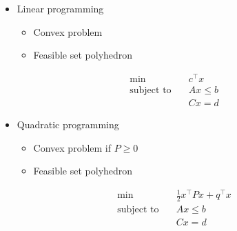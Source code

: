 \documentclass{article}
\begin{document}
\medskip   %
\begin{minipage}[c]{0.3\textwidth}
  \raggedright
  \begin{itemize}
    \item Linear programming
          \begin{itemize}
            \item Convex problem
            \item Feasible set polyhedron
          \end{itemize}
  \end{itemize}
\end{minipage}
\begin{minipage}[c]{0.3\textwidth}
  \centering
  \begin{align*}
    \min \quad              & c^{\top}x \\
    \text{subject to} \quad & Ax \leq b \\
                            & Cx = d
  \end{align*}
\end{minipage}
\begin{minipage}[c]{0.3\textwidth}
  \raggedleft
\end{minipage}

\begin{minipage}[c]{0.3\textwidth}
  \raggedright
  \begin{itemize}
    \item Quadratic programming
          \begin{itemize}
            \item Convex problem  if $P \geq 0$
            \item Feasible set polyhedron
          \end{itemize}
  \end{itemize}
\end{minipage}
\begin{minipage}[c]{0.3\textwidth}
  \centering
  \begin{align*}
    \min \quad              & \frac{1}{2}x^{\top}Px + q^{\top}x \\
    \text{subject to} \quad & Ax \leq b                         \\
                            & Cx = d
  \end{align*}
\end{minipage}
\begin{minipage}[c]{0.3\textwidth}
  \raggedleft
\end{minipage}
\end{document}
